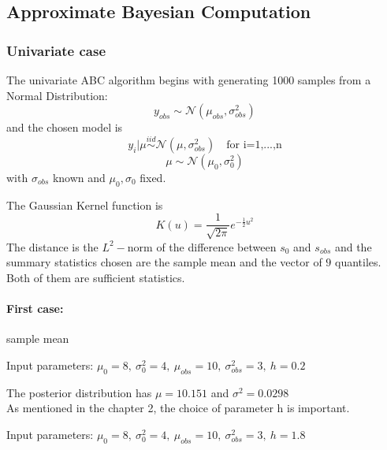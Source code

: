 \documentclass {article}
\begin{document}
\subsection{Approximate Bayesian Computation}

\subsubsection{Univariate case}
The univariate ABC algorithm begins with generating 1000 samples from a Normal Distribution:
$$
	y_{obs} \sim  \mathcal{N} (\mu_{obs}, \sigma_{obs} ^2)
$$ 
and the chosen model is
$$
	y_{i} | \mu  \overset{iid}\sim \mathcal{N}(\mu, \sigma_{obs} ^2) \quad \text{for i=1,...,n}
$$
$$
	\mu  \sim \mathcal{N}(\mu_{0}, \sigma_{0}^2)
$$
with $ \sigma_{obs}$ known and $\mu_{0}, \sigma_{0} $ fixed.

The Gaussian Kernel function is
$$
	K(u) = \frac{1}{\sqrt{2\pi}} e^{-\frac{1}{2}u^2}
$$
The distance is the $L^2-$norm of the difference between $s_{0}$ and $s_{obs}$ and the summary statistics chosen are the sample mean and the vector of $9$ quantiles. Both of them are sufficient statistics.

\paragraph{First case:} sample mean\\
\begin{center} Input parameters: $\mu_{0}=8,\  \sigma_{0}^2=4,\  \mu_{obs}=10,\  \sigma_{obs}^2 =3,\ h=0.2$   \end{center}

\begin{figure}[h!]
	\centering
	\caption{}
	\label{abch02}
\end{figure}
\begin{figure}[h!]
	\centering
	\caption{}
	\label{abcsample02}
\end{figure}


The posterior distribution has $\mu=10.151$ and $\sigma^2=0.0298$ \\

As mentioned in the chapter 2, the choice of parameter h is important.  \\
\begin{center} Input parameters: $\mu_{0}=8,\  \sigma_{0}^2=4,\  \mu_{obs}=10,\  \sigma_{obs}^2 =3,\ h=1.8$  \end{center}
\end{document}
